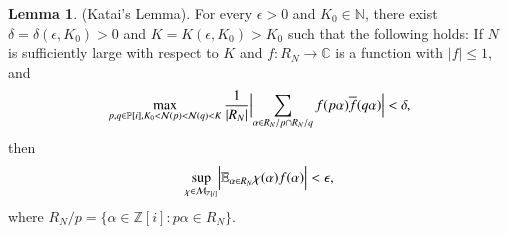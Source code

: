 \documentclass[12pt,amstex]{amsart}
\theoremstyle{definition}
\newtheorem{lem}[thm]{Lemma}
\def \Z {\mathbb{Z}[i]}
\def \P {\mathbb{P}[i]}
\def \A {\alpha}
\def \d {\delta}
\def \e {\epsilon}
\begin{document}
\begin{lem}\label{katai}(Katai's Lemma).
  For every $\e>0$ and $K_{0}\in\mathbb{N}$, there exist $\d=\d(\e,K_{0})>0$ and $K=K(\e,K_{0})>K_{0}$ such that the following holds: If $N$ is sufficiently large with respect to $K$ and $f\colon R_{N}\rightarrow\mathbb{C}$ is a function with $\vert f\vert\leq 1$, and
    \begin{equation}\label{kt4}
  \begin{split}
    \max_{p,q\in\P, K_{0}<\mathcal{N}(p)<\mathcal{N}(q)<K}\frac{1}{\vert R_{N}\vert}\Bigl\vert\sum_{\A\in R_{N}/p\cap R_{N}/q}f(p\A)\overline{f}(q\A)\Bigr\vert<\d,
  \end{split}
\end{equation}
then
    \begin{equation}\nonumber
  \begin{split}
    \sup_{\chi\in\mathcal{M}_{\Z}}\Bigl\vert\mathbb{E}_{\A\in R_{N}}\chi(\A)f(\A)\Bigr\vert<\e,
  \end{split}
\end{equation}
where $R_{N}/p=\{\A\in\Z\colon p\A\in R_{N}\}$.
\end{lem}
\end{document}
